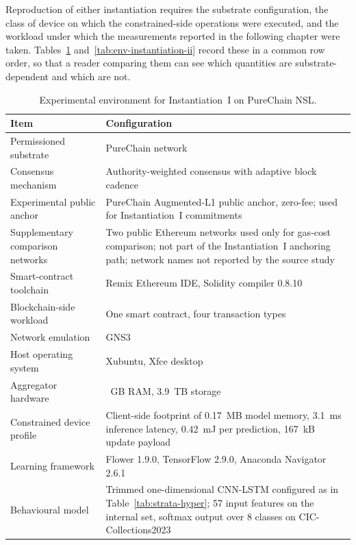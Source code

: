 Reproduction of either instantiation requires the substrate configuration, the class of device on which the constrained-side operations were executed, and the workload under which the measurements reported in the following chapter were taken. Tables~\ref{tab:env-instantiation-i} and~\ref{tab:env-instantiation-ii} record these in a common row order, so that a reader comparing them can see which quantities are substrate-dependent and which are not.

\begin{table}[!htbp]
  \centering
  \footnotesize
  \setlength{\tabcolsep}{5pt}
  \renewcommand{\arraystretch}{1.3}
  \caption{Experimental environment for Instantiation~I on PureChain NSL.}
  \label{tab:env-instantiation-i}
  \begin{tabularx}{\textwidth}{@{}
      >{\raggedright\arraybackslash}p{4.4cm}
      >{\raggedright\arraybackslash}X@{}}
    \toprule
    \textbf{Item} & \textbf{Configuration} \\
    \midrule
    Permissioned substrate & PureChain network \\
    Consensus mechanism & Authority-weighted consensus with adaptive block cadence \\
    Experimental public anchor & PureChain Augmented-L1 public anchor, zero-fee; used for Instantiation~I commitments \\
    Supplementary comparison networks & Two public Ethereum networks used only for gas-cost comparison; not part of the Instantiation~I anchoring path; network names not reported by the source study \\
    Smart-contract toolchain & Remix Ethereum IDE, Solidity compiler 0.8.10 \\
    Blockchain-side workload & One smart contract, four transaction types \\
    Network emulation & GNS3 \\
    Host operating system & Xubuntu, Xfce desktop \\
    Aggregator hardware & 251.4~GB RAM, 3.9~TB storage \\
    Constrained device profile & Client-side footprint of 0.17~MB model memory, 3.1~ms inference latency, 0.42~mJ per prediction, 167~kB update payload \\
    Learning framework & Flower 1.9.0, TensorFlow 2.9.0, Anaconda Navigator 2.6.1 \\
    Behavioural model & Trimmed one-dimensional CNN-LSTM configured as in Table~\ref{tab:strata-hyper}; 57 input features on the internal set, softmax output over 8 classes on CIC-Collections2023 \\

\end{tabularx}
\end{table}
